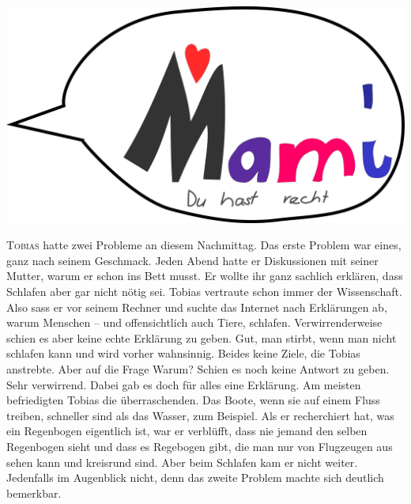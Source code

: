﻿\thispagestyle{empty}
\begin{center}
\includegraphics[width=\textwidth]{./bilder/fangen.png}
\end{center}
\vspace*{\fill}
{\centering\fontsize{50}{48} \color{farbe}\par}
\newpage
\lettrine[lines=3, lhang=.2, loversize=.25, lraise=0.05, findent=0.1em,
nindent=0em]{T}{obias} hatte zwei Probleme an diesem Nachmittag. Das erste Problem war eines, ganz nach seinem Geschmack. Jeden Abend hatte er Diskussionen mit seiner Mutter, warum er schon ins Bett musst. Er wollte ihr ganz sachlich erklären, dass Schlafen aber gar nicht nötig sei. Tobias vertraute schon immer der Wissenschaft. Also sass er vor seinem Rechner und suchte das Internet nach Erklärungen ab, warum Menschen – und offensichtlich auch Tiere, schlafen. Verwirrenderweise schien es aber keine echte Erklärung zu geben. Gut, man stirbt, wenn man nicht schlafen kann und wird vorher wahnsinnig. Beides keine Ziele, die Tobias anstrebte. Aber auf die Frage Warum? Schien es noch keine Antwort zu geben. Sehr verwirrend. Dabei gab es doch für alles eine Erklärung. Am meisten befriedigten Tobias die überraschenden. Das Boote, wenn sie auf einem Fluss treiben, schneller sind als das Wasser, zum Beispiel. Als er recherchiert hat, was ein Regenbogen eigentlich ist, war er verblüfft, dass nie jemand den selben Regenbogen sieht und dass es Regebogen gibt, die man nur von Flugzeugen aus sehen kann und kreisrund sind. Aber beim Schlafen kam er nicht weiter. Jedenfalls im Augenblick nicht, denn das zweite Problem machte sich deutlich bemerkbar.


